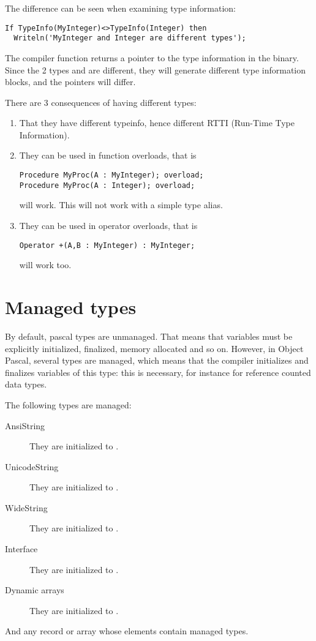 The difference can be seen when examining type information:
\begin{verbatim}
If TypeInfo(MyInteger)<>TypeInfo(Integer) then
  Writeln('MyInteger and Integer are different types');
\end{verbatim}
The compiler function  returns a pointer to the type
information in the binary. Since the 2 types  and
 are different, they will generate different type 
information blocks, and the pointers will differ.

There are 3 consequences of having different types:
\begin{enumerate}
\item That they have different typeinfo, hence different RTTI (Run-Time Type Information).
\item They can be used in function overloads, that is
\begin{verbatim}
Procedure MyProc(A : MyInteger); overload;
Procedure MyProc(A : Integer); overload;
\end{verbatim}
will work. This will not work with a simple type alias.
\item They can be used in operator overloads, that is
\begin{verbatim}
Operator +(A,B : MyInteger) : MyInteger; 
\end{verbatim}
will work too.
\end{enumerate}

\section{Managed types}
\label{se:managedtypes}
By default, pascal types are unmanaged. That means that variables must be
explicitly initialized, finalized, memory allocated and so on. 
However, in Object Pascal, several types are managed, which means that the 
compiler initializes and finalizes variables of this type: this is necessary, 
for instance for reference counted data types.

The following types are managed:
\begin{description}
\item[AnsiString] They are initialized  to .
\item[UnicodeString] They are initialized  to .
\item[WideString] They are initialized  to .
\item[Interface] They are initialized  to .
\item[Dynamic arrays] They are initialized  to .
\end{description}
And any record or array whose elements contain managed types.


